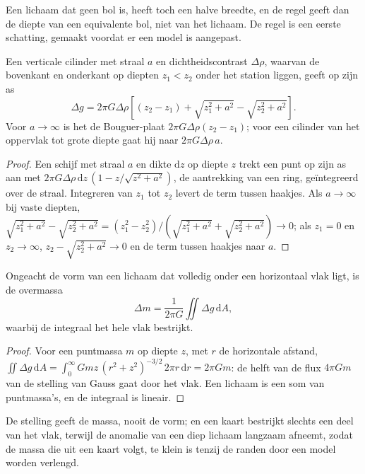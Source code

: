 Een lichaam dat geen bol is, heeft toch een halve breedte, en de regel geeft dan
de diepte van een equivalente bol, niet van het lichaam. De regel is
een eerste schatting, gemaakt voordat er een model is aangepast.

\begin{proposition}\label{prop:b3:field-lab-methods-3:vcyl}
Een verticale cilinder met straal $a$ en dichtheidscontrast $\Delta\rho$,
waarvan de bovenkant en onderkant op diepten $z_1 < z_2$ onder het station liggen,
geeft op zijn as
\[
\Delta g = 2\pi G\Delta\rho\left[(z_2 - z_1) + \sqrt{z_1^2 + a^2}
           - \sqrt{z_2^2 + a^2}\right] .
\]
Voor $a \to \infty$ is het de Bouguer-plaat $2\pi G\Delta\rho(z_2 - z_1)$;
voor een cilinder van het oppervlak tot grote diepte gaat hij naar
$2\pi G\Delta\rho\,a$.
\end{proposition}

\begin{proof}
Een schijf met straal $a$ en dikte $\mathrm{d}z$ op diepte $z$ trekt
een punt op zijn as aan met $2\pi G\Delta\rho\,\mathrm{d}z\,(1 -
z/\sqrt{z^2 + a^2})$, de aantrekking van een ring, geïntegreerd over de
straal. Integreren van $z_1$ tot $z_2$ levert de term tussen haakjes. Als $a \to
\infty$ bij vaste diepten, $\sqrt{z_1^2 + a^2} - \sqrt{z_2^2 + a^2} =
(z_1^2 - z_2^2)/(\sqrt{z_1^2 + a^2} + \sqrt{z_2^2 + a^2}) \to 0$; als
$z_1 = 0$ en $z_2 \to \infty$, $z_2 - \sqrt{z_2^2 + a^2} \to 0$ en
de term tussen haakjes naar $a$.
\end{proof}

\begin{proposition}\label{prop:b3:field-lab-methods-3:gauss}
Ongeacht de vorm van een lichaam dat volledig onder een horizontaal
vlak ligt, is de overmassa
\[
\Delta m = \frac{1}{2\pi G}\iint \Delta g\,\mathrm{d}A ,
\]
waarbij de integraal het hele vlak bestrijkt.
\end{proposition}

\begin{proof}
Voor een puntmassa $m$ op diepte $z$, met $r$ de horizontale afstand,
$\iint \Delta g\,\mathrm{d}A = \int_0^\infty
Gmz\,(r^2 + z^2)^{-3/2}\,2\pi r\,\mathrm{d}r = 2\pi Gm$: de helft van de flux
$4\pi Gm$ van de stelling van Gauss gaat door het vlak. Een lichaam is een som van
puntmassa's, en de integraal is lineair.
\end{proof}

De stelling geeft de massa, nooit de vorm; en een kaart bestrijkt slechts een deel
van het vlak, terwijl de anomalie van een diep lichaam langzaam afneemt, zodat de
massa die uit een kaart volgt, te klein is tenzij de randen door een
model worden verlengd.

